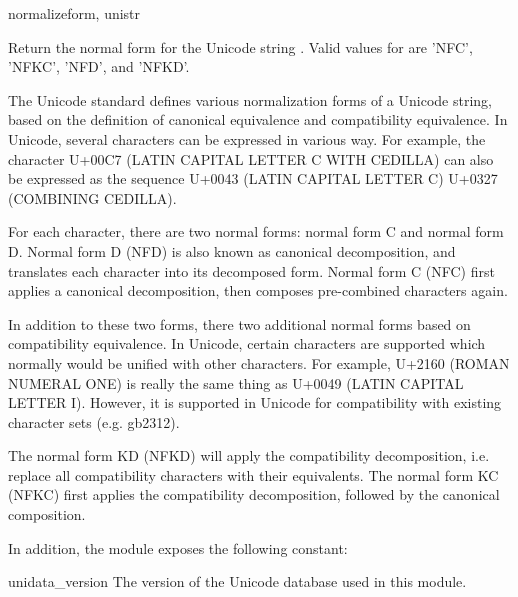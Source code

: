 \begin{funcdesc}{normalize}{form, unistr}

Return the normal form  for the Unicode string .
Valid values for  are 'NFC', 'NFKC', 'NFD', and 'NFKD'.

The Unicode standard defines various normalization forms of a Unicode
string, based on the definition of canonical equivalence and
compatibility equivalence. In Unicode, several characters can be
expressed in various way. For example, the character U+00C7 (LATIN
CAPITAL LETTER C WITH CEDILLA) can also be expressed as the sequence
U+0043 (LATIN CAPITAL LETTER C) U+0327 (COMBINING CEDILLA).

For each character, there are two normal forms: normal form C and
normal form D. Normal form D (NFD) is also known as canonical
decomposition, and translates each character into its decomposed form.
Normal form C (NFC) first applies a canonical decomposition, then
composes pre-combined characters again.

In addition to these two forms, there two additional normal forms
based on compatibility equivalence. In Unicode, certain characters are
supported which normally would be unified with other characters. For
example, U+2160 (ROMAN NUMERAL ONE) is really the same thing as U+0049
(LATIN CAPITAL LETTER I). However, it is supported in Unicode for
compatibility with existing character sets (e.g. gb2312).

The normal form KD (NFKD) will apply the compatibility decomposition,
i.e. replace all compatibility characters with their equivalents. The
normal form KC (NFKC) first applies the compatibility decomposition,
followed by the canonical composition.

\end{funcdesc}

In addition, the module exposes the following constant:

\begin{datadesc}{unidata_version}
The version of the Unicode database used in this module.

\end{datadesc}
